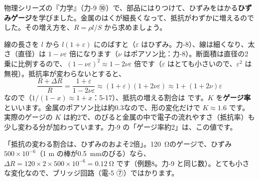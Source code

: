 \label{ph:電-4:sec8}
物理シリーズの『力学』（力-9 ⑩）で、部品にはりつけて、ひずみをはかる\textbf{ひずみゲージ}を学びました。金属のはくが細長くなって、抵抗がわずかに増えるのでした。その増え方を、$R=\rho l/S$ から求めましょう。

\begin{bkfigure}
\label{ph:電-4:fig-gauge}
\end{bkfigure}

\noindent 線の長さを $l$ から $l(1+\varepsilon)$ にのばすと（$\varepsilon$ はひずみ。力-8）、線は細くなり、太さ（直径）は $1-\nu\varepsilon$ 倍になります（$\nu$ はポアソン比：力-8）。断面積は直径の2乗に比例するので、$(1-\nu\varepsilon)^2\approx1-2\nu\varepsilon$ 倍です（$\varepsilon$ はとても小さいので、$\varepsilon^2$ は無視）。抵抗率が変わらないとすると、
\[\frac{R+\Delta R}{R}=\frac{1+\varepsilon}{1-2\nu\varepsilon}\approx(1+\varepsilon)(1+2\nu\varepsilon)\approx1+(1+2\nu)\varepsilon\]
なので（$1/(1-x)\approx1+x$：5-17）、抵抗の増える割合は
です。$K$ を\textbf{ゲージ率}といいます。金属のポアソン比は約0.3なので、形の変化だけで $K\approx1.6$ です。実際のゲージの $K$ は約2で、のびると金属の中で電子の流れやすさ（抵抗率）も少し変わる分が加わっています。力-9 の「ゲージ率約2」は、この値です。

\begin{phyomi}[$\dfrac{\Delta R}{R}=K\varepsilon$]
「抵抗の変わる割合は、ひずみのおよそ2倍」。\qty{120}{\ohm}のゲージで、ひずみ $500\times10^{-6}$（1 m の棒が\qty{0.5}{mm}のびる）なら、$\Delta R=120\times2\times500\times10^{-6}=\qty{0.12}{\ohm}$ です（例題8。力-9 と同じ数）。とても小さな変化なので、ブリッジ回路（電-5 ⑦）ではかります。
\end{phyomi}

